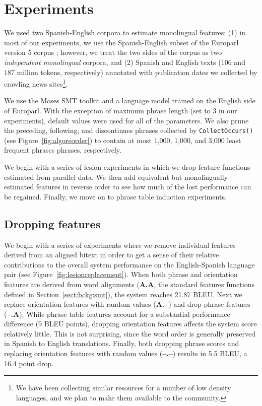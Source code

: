 \documentclass[11pt]{article}
\newcommand{\mnote}[1]{\marginpar{%
  \vskip-\baselineskip
  \raggedright\footnotesize
  \itshape\hrule\smallskip\tiny{#1}\par\smallskip\hrule}}
\newcommand{\mtodo}[1]{\mnote{\textcolor{red}{#1}}}
\newcommand{\todo}[1]{\textcolor{red}{TODO: #1}}
\newcommand{\secref}[1]{Section~\ref{#1}}
\newcommand{\figref}[1]{Figure~\ref{#1}}
\begin{document}


\section{Experiments} \label{sect:exp}

We used two Spanish-English corpora to estimate monolingual features: (1) in most of our experiments, we use the Spanish-English subset of the Europarl version 5 corpus \cite{Koehn:2005}; however, we treat the two sides of the corpus as two {\em independent monolingual} corpora, and (2)  Spanish and English texts (106 and 187 million tokens, respectively) annotated with publication dates we collected by crawling news sites\footnote{We have been collecting similar resources for a number of low density languages, and we plan to make them available to the community.}.

We use the Moses SMT toolkit\mtodo{Add a moses citation} and a language model trained on the English side of Europarl.  With the exception of maximum phrase length (set to 3 in our experiments\mtodo{Add the phrase length vs. performance curve?}), default values were used for all of the parameters.  We also prune the preceding, following, and discontinues phrases collected by {\tt \small CollectOccurs()} (see \figref{fig:algoreorder}) to contain at most 1,000, 1,000, and 3,000 least frequent phrases phrases, respectively.

We begin with a series of lesion experiments in which we drop feature functions estimated from parallel data.  We then add equivalent but monolingually estimated features in reverse order to see how much of the lost performance can be regained.  Finally, we move on to phrase table induction experiments.

\subsection{Dropping features}  \label{sect:exp:lesions}

We begin with a series of experiments where we remove individual features derived from an aligned bitext in order to get a sense of their relative contributions to the overall system performance on the English-Spanish language pair (see \figref{fig:lesionreplacement}).  When both phrase and orientation features are derived from word alignments ({\bf A.A}, the standard features functions defined in \secref{sect:bckg:smt}), the system reaches 21.87 BLEU.  Next we replace orientation features with random values ({\bf A.--}) and drop phrase features ({\bf --.A}).  While phrase table features account for a substantial performance difference (9 BLEU points), dropping orientation features affects the system score relatively little.  This is not surprising, since the word order is generally preserved in Spanish to English translations.  Finally, both dropping phrase scores and replacing orientation features with random values ({\bf --.--}) results in 5.5 BLEU, a 16.4 point drop.
\end{document}
